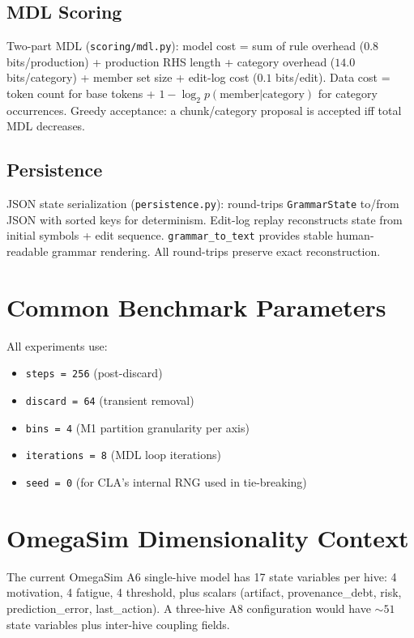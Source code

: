 \documentclass[11pt]{article}
\begin{document}
\subsection{MDL Scoring}

Two-part MDL (\texttt{scoring/mdl.py}): model cost = sum of rule
overhead ($0.8$ bits/production) + production RHS length + category
overhead ($14.0$ bits/category) + member set size + edit-log cost
($0.1$ bits/edit). Data cost = token count for base tokens +
$1 - \log_2 p(\text{member}|\text{category})$ for category occurrences.
Greedy acceptance: a chunk/category proposal is accepted iff total MDL
decreases.

\subsection{Persistence}

JSON state serialization (\texttt{persistence.py}): round-trips
\texttt{GrammarState} to/from JSON with sorted keys for determinism.
Edit-log replay reconstructs state from initial symbols + edit sequence.
\texttt{grammar\_to\_text} provides stable human-readable grammar
rendering. All round-trips preserve exact reconstruction.

\section{Common Benchmark Parameters}

All experiments use:
\begin{itemize}
\item \texttt{steps = 256} (post-discard)
\item \texttt{discard = 64} (transient removal)
\item \texttt{bins = 4} (M1 partition granularity per axis)
\item \texttt{iterations = 8} (MDL loop iterations)
\item \texttt{seed = 0} (for CLA's internal RNG used in tie-breaking)
\end{itemize}

\section{OmegaSim Dimensionality Context}

The current OmegaSim A6 single-hive model has 17 state variables per
hive: 4 motivation, 4 fatigue, 4 threshold, plus scalars (artifact,
provenance\_debt, risk, prediction\_error, last\_action). A three-hive
A8 configuration would have $\sim 51$ state variables plus inter-hive
coupling fields.
\end{document}
